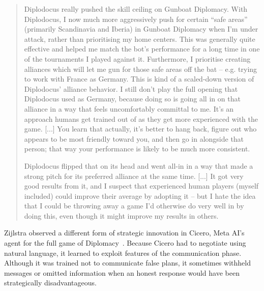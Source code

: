 \begin{quote}
Diplodocus really pushed the skill ceiling on Gunboat Diplomacy. With Diplodocus, I now much more aggressively push for certain ``safe areas'' (primarily Scandinavia and Iberia) in Gunboat Diplomacy when I'm under attack, rather than prioritising my home centers. This was generally quite effective and helped me match the bot's performance for a long time in one of the tournaments I played against it.
Furthermore, I prioritise creating alliances which will let me gun for those safe areas off the bat -- e.g. trying to work with France as Germany. This is kind of a scaled-down version of Diplodocus' alliance behavior.
I still don't play the full opening that Diplodocus used as Germany, because doing so is going all in on that alliance in a way that feels uncomfortably committal to me. It's an approach humans get trained out of as they get more experienced with the game. [...] You learn that actually, it's better to hang back, figure out who appears to be most friendly toward you, and then go in alongside that person; that way your performance is likely to be much more consistent.

Diplodocus flipped that on its head and went all-in in a way that made a strong pitch for its preferred alliance at the same time. [...] It got very good results from it, and I suspect that experienced human players (myself included) could improve their average by adopting it -- but I hate the idea that I could be throwing away a game I'd otherwise do very well in by doing this, even though it might improve my results in others.
\end{quote}

Zijlstra observed a different form of strategic innovation in Cicero, Meta AI's agent for the full game of Diplomacy~\citep{meta2022humandiplomacy}. Because Cicero had to negotiate using natural language, it learned to exploit features of the communication phase. Although it was trained not to communicate false plans, it sometimes withheld messages or omitted information when an honest response would have been strategically disadvantageous.

